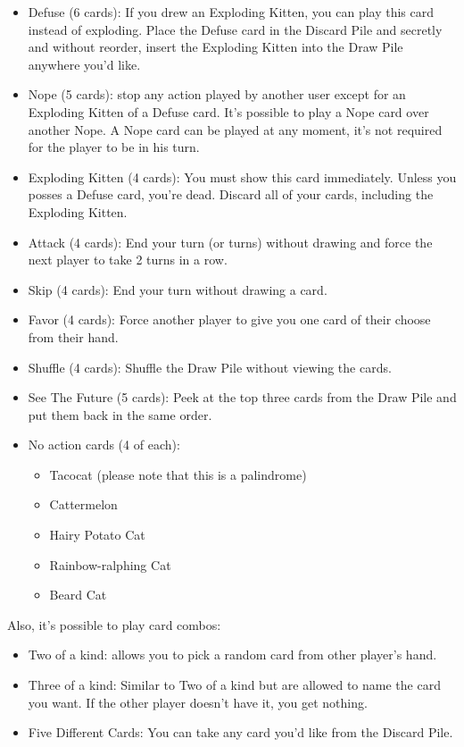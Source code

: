 \documentclass[11pt, fuzz]{article}
\begin{document}
\begin{itemize}
    \item Defuse (6 cards): If you drew an Exploding Kitten, you can play this card instead of exploding. Place the Defuse card in the Discard Pile and secretly and without reorder, insert the Exploding Kitten into the Draw Pile anywhere you'd like. 
    \item Nope (5 cards): stop any action played by another user except for an Exploding Kitten of a Defuse card. It's possible to play a Nope card over another Nope. A Nope card can be played at any moment, it's not required for the player to be in his turn. 
    \item Exploding Kitten (4 cards): You must show this card immediately. Unless you posses a Defuse card, you're dead. Discard all of your cards, including the Exploding Kitten. 
    \item Attack (4 cards): End your turn (or turns) without drawing and force the next player to take 2 turns in a row. 
    \item Skip (4 cards): End your turn without drawing a card. 
    \item Favor (4 cards): Force another player to give you one card of their choose from their hand. 
    \item Shuffle (4 cards): Shuffle the Draw Pile without viewing the cards.
    \item See The Future (5 cards): Peek at the top three cards from the Draw Pile and put them back in the same order. 
    \item No action cards (4 of each):
        \begin{itemize}
            \item Tacocat (please note that this is a palindrome)
            \item Cattermelon
            \item Hairy Potato Cat
            \item Rainbow-ralphing Cat
            \item Beard Cat
        \end{itemize}
\end{itemize}

Also, it's possible to play card combos:

\begin{itemize}
    \item Two of a kind: allows you to pick a random card from other player's hand. 
    \item Three of a kind: Similar to Two of a kind but are allowed to name the card you want. If the other player doesn't have it, you get nothing. 
    \item Five Different Cards: You can take any card you'd like from the Discard Pile. 
\end{itemize}
\end{document}
